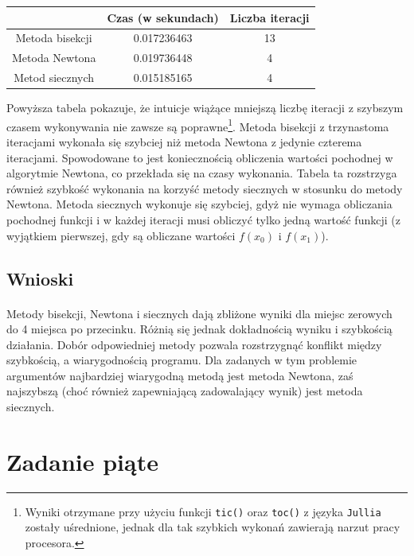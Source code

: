 \documentclass[a4paper]{article}
\begin{document}
\begin{center}
 \begin{tabular}{ |c | c | c|  }
 \hline
   & Czas (w sekundach) & Liczba iteracji\\
 \hline
 Metoda bisekcji & 0.017236463 & 13 \\
 Metoda Newtona & 0.019736448 & 4 \\
 Metod siecznych & 0.015185165 & 4 \\ 
 \hline
\end{tabular}
\end{center}

Powyższa tabela pokazuje, że intuicje wiążące mniejszą liczbę iteracji z szybszym czasem wykonywania nie zawsze są poprawne\footnote{Wyniki otrzymane przy użyciu funkcji \texttt{tic()} oraz \texttt{toc()} z języka \texttt{Jullia} zostały uśrednione, jednak dla tak szybkich wykonań zawierają narzut pracy procesora.}. Metoda bisekcji z trzynastoma iteracjami wykonała się szybciej niż metoda Newtona z jedynie czterema iteracjami. Spowodowane to jest koniecznością obliczenia wartości pochodnej w algorytmie Newtona, co przekłada się na czasy wykonania. Tabela ta rozstrzyga również szybkość wykonania na korzyść metody siecznych w stosunku do metody Newtona. Metoda siecznych wykonuje się szybciej, gdyż nie wymaga obliczania pochodnej funkcji i w każdej iteracji musi obliczyć tylko jedną wartość funkcji (z wyjątkiem pierwszej, gdy są obliczane wartości $f(x_{0})$ i $f(x_{1})$).

\subsection{Wnioski}
\paragraph{}
Metody bisekcji, Newtona i siecznych dają zbliżone wyniki dla miejsc zerowych do 4 miejsca po przecinku. Różnią się jednak dokładnością wyniku i szybkością działania. Dobór odpowiedniej metody pozwala rozstrzygnąć konflikt między szybkością, a wiarygodnością programu. Dla zadanych w tym problemie argumentów najbardziej wiarygodną metodą jest metoda Newtona, zaś najszybszą (choć również zapewniającą zadowalający wynik) jest metoda siecznych.


\section{Zadanie piąte}
\end{document}

